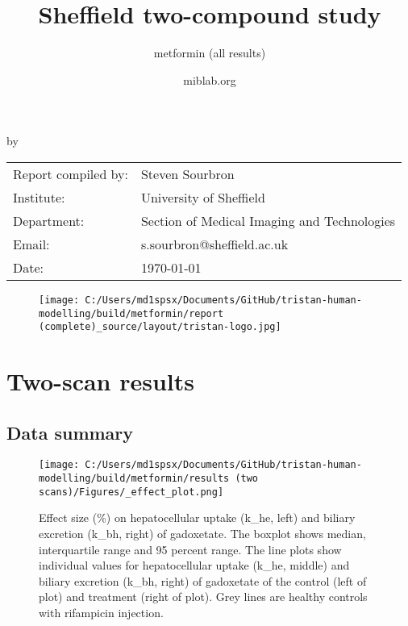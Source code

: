 \documentclass{epflreport}%
\begin{document}
%
\normalsize%
\frontmatter%
\title{Sheffield two{-}compound study}%
\subtitle{metformin (all results)}%
\author{miblab.org}%
\subject{D2.10 {-} Internal report}%
%
%
%
\makecover%
\begin{titlepage}%
\begin{center}%
\makeatletter%
\largetitlestyle\fontsize{45}{45}\selectfont\@title%
\makeatother%
\linebreak%
\makeatletter%
\ifdefvoid{\@subtitle}{}{\bigskip\titlestyle\fontsize{20}{20}\selectfont\@subtitle}%
\makeatother%
\linebreak%
\bigskip%
\bigskip%
by%
\linebreak%
\bigskip%
\bigskip%
\makeatletter%
\largetitlestyle\fontsize{25}{25}\selectfont\@author%
\makeatother%
\vfill%
\large%
\begin{tabular}{ll}%
\hline%
Report compiled by: &Steven Sourbron\\%
Institute: &University of Sheffield\\%
Department: &Section of Medical Imaging and Technologies\\%
Email: &s.sourbron@sheffield.ac.uk\\%
Date: &\today\\%
\hline%
\end{tabular}%


\begin{figure}[b!]%
\centering%
\centering%
\texttt{[image: C:/Users/md1spsx/Documents/GitHub/tristan-human-modelling/build/metformin/report (complete)\_source/layout/tristan-logo.jpg]}%
\end{figure}

%
\end{center}%
\end{titlepage}%
\newpage%
\tableofcontents%
\mainmatter%
\clearpage%
\chapter{Two{-}scan results}%
\section{Data summary}%
\label{sec:Datasummary}%

%


\begin{figure}[h!]%
\centering%
\texttt{[image: C:/Users/md1spsx/Documents/GitHub/tristan-human-modelling/build/metformin/results (two scans)/Figures/\_effect\_plot.png]}%
\caption{Effect size (\%) on hepatocellular uptake (k\_he, left) and biliary excretion (k\_bh, right) of gadoxetate. The boxplot shows median, interquartile range and 95 percent range. The line plots show individual values for hepatocellular uptake (k\_he, middle) and biliary excretion (k\_bh, right) of gadoxetate of the control (left of plot) and treatment (right of plot). Grey lines are healthy controls with rifampicin injection.}%
\end{figure}
\end{document}
